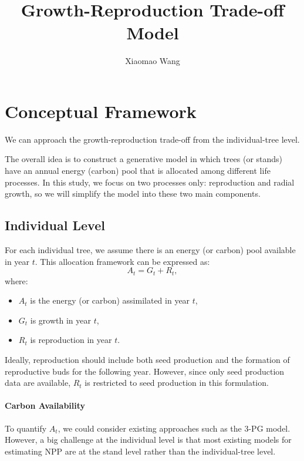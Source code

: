\documentclass[11pt]{article}
\title{Growth-Reproduction Trade-off Model}
\author{Xiaomao Wang}
\date{}
\begin{document}
\maketitle

\section{Conceptual Framework}

We can approach the growth-reproduction trade-off from the individual-tree level.

The overall idea is to construct a generative model in which trees (or stands) have an annual energy (carbon) pool that is allocated among different life processes. In this study, we focus on two processes only: reproduction and radial growth, so we will simplify the model into these two main components.

\subsection{Individual Level}

For each individual tree, we assume there is an energy (or carbon) pool available in year $t$. This allocation framework can be expressed as:
\begin{equation}
A_t = G_t + R_t,
\end{equation}
where:
\begin{itemize}
    \item $A_t$ is the energy (or carbon) assimilated in year $t$,
    \item $G_t$ is growth in year $t$,
    \item $R_t$ is reproduction in year $t$.
\end{itemize}

Ideally, reproduction should include both seed production and the formation of reproductive buds for the following year. However, since only seed production data are available, $R_t$ is restricted to seed production in this formulation.

\paragraph{Carbon Availability}

To quantify $A_t$, we could consider existing approaches such as the 3-PG model. However, a big challenge at the individual level is that most existing models for estimating NPP are at the stand level rather than the individual-tree level.
\end{document}
